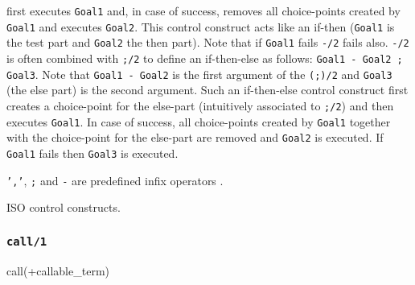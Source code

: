  first executes \texttt{Goal1} and,
in case of success, removes all choice-points created by \texttt{Goal1} and
executes \texttt{Goal2}. This control construct acts like an if-then
(\texttt{Goal1} is the test part and \texttt{Goal2} the then part). Note that
if \texttt{Goal1} fails \texttt{-{\gt}/2} fails also. \texttt{-{\gt}/2} is
often combined with \texttt{;/2} to define an if-then-else as follows:
\texttt{Goal1 -{\gt} Goal2 ; Goal3}. Note that \texttt{Goal1 -{\gt} Goal2}
is the first argument of the \texttt{(;)/2} and \texttt{Goal3} (the else
part) is the second argument. Such an if-then-else control construct first
creates a choice-point for the else-part (intuitively associated to
\texttt{;/2}) and then executes \texttt{Goal1}. In case of success, all
choice-points created by \texttt{Goal1} together with the choice-point for
the else-part are removed and \texttt{Goal2} is executed. If \texttt{Goal1}
fails then \texttt{Goal3} is executed.

\texttt{','}, \texttt{;} and \texttt{-{\gt}} are predefined infix operators
.

\begin{PlErrors}





\end{PlErrors}

\Portability

ISO control constructs.

\subsubsection{\texttt{call/1}}
\label{call/1}

\begin{TemplatesOneCol}
call(+callable\_term)

\end{TemplatesOneCol}

